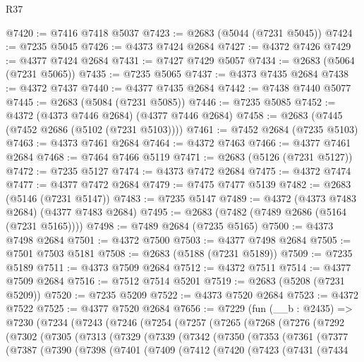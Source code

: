 \begin{lexlean}{R37}
\begin{coremodule}
@7420 := @7416 @7418 @5037
@7423 := @2683 (@5044 (@7231 @5045))
@7424 := @7235 @5045
@7426 := @4373 @7424 @2684
@7427 := @4372 @7426
@7429 := @4377 @7424 @2684
@7431 := @7427 @7429 @5057
@7434 := @2683 (@5064 (@7231 @5065))
@7435 := @7235 @5065
@7437 := @4373 @7435 @2684
@7438 := @4372 @7437
@7440 := @4377 @7435 @2684
@7442 := @7438 @7440 @5077
@7445 := @2683 (@5084 (@7231 @5085))
@7446 := @7235 @5085
@7452 := @4372 (@4373 @7446 @2684) (@4377 @7446 @2684)
@7458 := @2683 (@7445 (@7452 @2686 (@5102 (@7231 @5103))))
@7461 := @7452 @2684 (@7235 @5103)
@7463 := @4373 @7461 @2684
@7464 := @4372 @7463
@7466 := @4377 @7461 @2684
@7468 := @7464 @7466 @5119
@7471 := @2683 (@5126 (@7231 @5127))
@7472 := @7235 @5127
@7474 := @4373 @7472 @2684
@7475 := @4372 @7474
@7477 := @4377 @7472 @2684
@7479 := @7475 @7477 @5139
@7482 := @2683 (@5146 (@7231 @5147))
@7483 := @7235 @5147
@7489 := @4372 (@4373 @7483 @2684) (@4377 @7483 @2684)
@7495 := @2683 (@7482 (@7489 @2686 (@5164 (@7231 @5165))))
@7498 := @7489 @2684 (@7235 @5165)
@7500 := @4373 @7498 @2684
@7501 := @4372 @7500
@7503 := @4377 @7498 @2684
@7505 := @7501 @7503 @5181
@7508 := @2683 (@5188 (@7231 @5189))
@7509 := @7235 @5189
@7511 := @4373 @7509 @2684
@7512 := @4372 @7511
@7514 := @4377 @7509 @2684
@7516 := @7512 @7514 @5201
@7519 := @2683 (@5208 (@7231 @5209))
@7520 := @7235 @5209
@7522 := @4373 @7520 @2684
@7523 := @4372 @7522
@7525 := @4377 @7520 @2684
@7656 := @7229
    (fun (__b : @2435) =>
    @7230
      (@7234
        (@7243
          (@7246
            (@7254
              (@7257
                (@7265
                  (@7268
                    (@7276
                      (@7292
                        (@7302
                          (@7305
                            (@7313
                              (@7329
                                (@7339
                                  (@7342
                                    (@7350
                                      (@7353
                                        (@7361
                                          (@7377
                                            (@7387
                                              (@7390
                                                (@7398
                                                  (@7401
                                                    (@7409
                                                      (@7412
                                                        (@7420
                                                          (@7423
                                                            (@7431
                                                              (@7434

\end{coremodule}
\end{lexlean}
